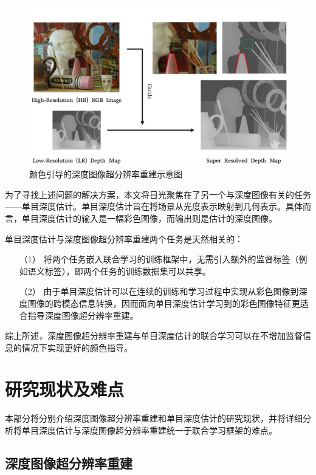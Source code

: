 \begin{figure}[!htbp]
\vspace{-0.8cm}  %
	\centering
	\includegraphics[scale=0.14]{figures/1}
	\caption{颜色引导的深度图像超分辨率重建示意图}
	\label{fig:1-1}
\end{figure}

为了寻找上述问题的解决方案，本文将目光聚焦在了另一个与深度图像有关的任务——单目深度估计。单目深度估计旨在将场景从光度表示映射到几何表示。具体而言，单目深度估计的输入是一幅彩色图像，而输出则是估计的深度图像。

单目深度估计与深度图像超分辨率重建两个任务是天然相关的：
\begin{enumerate}
	\item[（1）]	将两个任务嵌入联合学习的训练框架中，无需引入额外的监督标签（例如语义标签），即两个任务的训练数据集可以共享。
	\item[（2）] 由于单目深度估计可以在连续的训练和学习过程中实现从彩色图像到深度图像的跨模态信息转换，因而面向单目深度估计学习到的彩色图像特征更适合指导深度图像超分辨率重建。
\end{enumerate}

综上所述，深度图像超分辨率重建与单目深度估计的联合学习可以在不增加监督信息的情况下实现更好的颜色指导。

\section{研究现状及难点}

本部分将分别介绍深度图像超分辨率重建和单目深度估计的研究现状，并将详细分析将单目深度估计与深度图像超分辨率重建统一于联合学习框架的难点。

\subsection{深度图像超分辨率重建}

